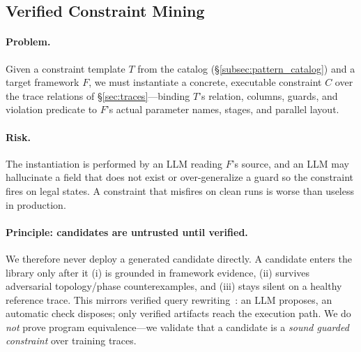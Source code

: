 
\subsection{Verified Constraint Mining}
\label{subsec:invariant_miner}

\paragraph{Problem.} Given a constraint template $T$ from the catalog (\S\ref{subsec:pattern_catalog}) and a target framework $F$, we must instantiate a concrete, executable constraint $C$ over the trace relations of \S\ref{sec:traces}---binding $T$'s relation, columns, guards, and violation predicate to $F$'s actual parameter names, stages, and parallel layout.

\paragraph{Risk.} The instantiation is performed by an LLM reading $F$'s source, and an LLM may hallucinate a field that does not exist or over-generalize a guard so the constraint fires on legal states. A constraint that misfires on clean runs is worse than useless in production.

\paragraph{Principle: candidates are untrusted until verified.} We therefore never deploy a generated candidate directly. A candidate enters the library only after it (i) is grounded in framework evidence, (ii) survives adversarial topology/phase counterexamples, and (iii) stays silent on a healthy reference trace. This mirrors verified query rewriting~\cite{qure}: an LLM proposes, an automatic check disposes; only verified artifacts reach the execution path. We do \emph{not} prove program equivalence---we validate that a candidate is a \emph{sound guarded constraint} over training traces.

